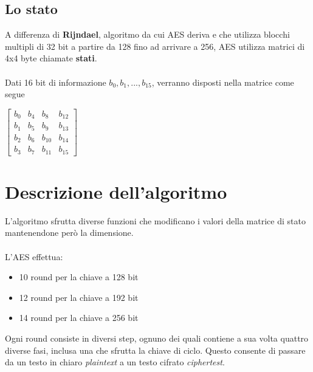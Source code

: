 \subsection{Lo stato}
A differenza di \textbf{Rijndael}, algoritmo da cui AES deriva e che utilizza blocchi multipli di 32 bit a partire da 128 fino ad arrivare a 256, AES utilizza matrici di 4x4 byte chiamate \textbf{stati}.
\paragraph{} Dati 16 bit di informazione \(b_0,b_1,...,b_15\), verranno disposti nella matrice come segue

\begin{table}[H]
\centering
\(
\begin{bmatrix}
b_0 & b_4 & b_8 & b_{12} \\
b_1 & b_5 & b_9 & b_{13} \\
b_2 & b_6 & b_{10} & b_{14} \\
b_3 & b_7 & b_{11} & b_{15}
\end{bmatrix}
\)
\end{table}


\section{Descrizione dell'algoritmo}
L'algoritmo sfrutta diverse funzioni che modificano i valori della matrice di stato mantenendone però la dimensione. 
\paragraph{}
L'AES effettua:
\begin{itemize}
\item 10 round per la chiave a 128 bit
\item 12 round per la chiave a 192 bit
\item 14 round per la chiave a 256 bit
\end{itemize}

Ogni round consiste in diversi step, ognuno dei quali contiene  a sua volta quattro diverse fasi, inclusa una che sfrutta la chiave di ciclo. Questo consente di passare da un testo in chiaro \textit{plaintext} a un testo cifrato \textit{ciphertest}.


